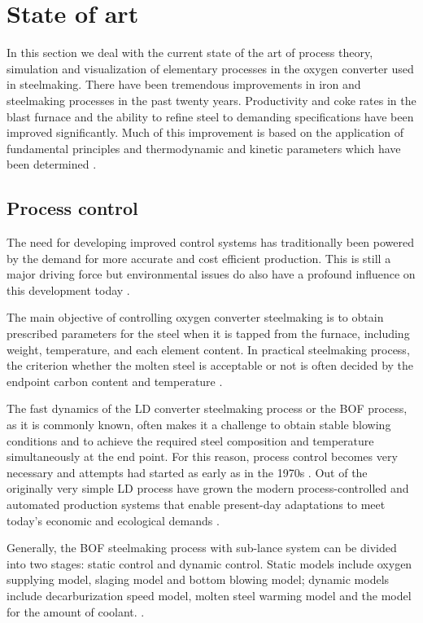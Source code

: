 \section{State of art}

In this section we deal with the current state of the art of process theory, simulation and visualization of elementary processes in the oxygen converter used in steelmaking. There have been tremendous improvements in iron and steelmaking processes in the past twenty years. Productivity and coke rates in the blast furnace and the ability to refine steel to demanding specifications have been improved significantly. Much of this improvement is based on the application of fundamental principles and thermodynamic and kinetic parameters which have been determined \citep{Turkdogan1999}.

\subsection{Process control}

The need for developing improved control systems has traditionally been powered by the demand for more accurate and cost efficient production. This is still a major driving force but environmental issues do also have a profound influence on this development today \citep{Widlund1998}.

The main objective of controlling oxygen converter steelmaking is to obtain prescribed parameters for the steel when it is tapped from the furnace, including weight, temperature, and each element content. In practical steelmaking process, the criterion whether the molten steel is acceptable or not is often decided by the endpoint carbon content and temperature \citep{Wang2010}.

The fast dynamics of the LD converter steelmaking process or the BOF process, as it is commonly known, often makes it a challenge to obtain stable blowing conditions and to achieve the required steel composition and temperature simultaneously at the end point. For this reason, process control becomes very necessary and attempts had started as early as in the 1970s \citep{Fritz2005}. Out of the originally very simple LD process have grown the modern process-controlled and automated production systems that enable present-day adaptations to meet today’s economic and ecological demands \citep{Sarkar2015}.

Generally, the BOF steelmaking process with sub-lance system can be divided into two stages: static control and dynamic control. Static models include oxygen supplying model, slaging model and bottom blowing model; dynamic models include decarburization speed model, molten steel warming model and the model for the amount of coolant. \citep{Wang2010}.


